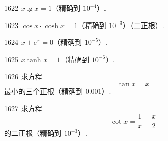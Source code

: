 \begin{prob}[S]{1622}
$x\lg x = 1$（精确到 $10^{-4}$）.
\end{prob}

\begin{prob}[S]{1623}
$\cos x \cdot \cosh x = 1$（精确到 $10^{-3}$）（二正根）.
\end{prob}

\begin{prob}[S]{1624}
$x + \mathrm{e}^x = 0$（精确到 $10^{-5}$）.
\end{prob}

\begin{prob}[S]{1625}
$x\tanh x = 1$（精确到 $10^{-6}$）.
\end{prob}

\begin{prob}[M]{1626}
求方程
\[
\tan x = x
\]
最小的三个正根（精确到 $0.001$）.
\end{prob}

\begin{prob}[M]{1627}
求方程
\[
\cot x = \frac{1}{x} - \frac{x}{2}
\]
的二正根（精确到 $10^{-3}$）.
\end{prob}
